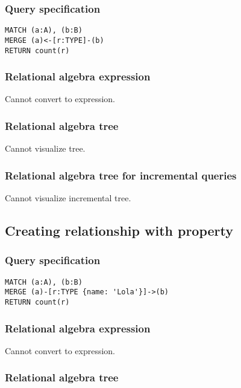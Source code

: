 \subsubsection*{Query specification}

\begin{lstlisting}
MATCH (a:A), (b:B)
MERGE (a)<-[r:TYPE]-(b)
RETURN count(r)
\end{lstlisting}

\subsubsection*{Relational algebra expression}

Cannot convert to expression.

\subsubsection*{Relational algebra tree}

Cannot visualize tree.

\subsubsection*{Relational algebra tree for incremental queries}

Cannot visualize incremental tree.

\subsection{Creating relationship with property}

\subsubsection*{Query specification}

\begin{lstlisting}
MATCH (a:A), (b:B)
MERGE (a)-[r:TYPE {name: 'Lola'}]->(b)
RETURN count(r)
\end{lstlisting}

\subsubsection*{Relational algebra expression}

Cannot convert to expression.

\subsubsection*{Relational algebra tree}


